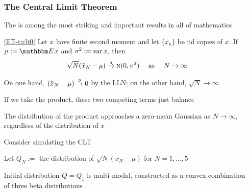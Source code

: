 \begin{frame}\frametitle{The Central Limit Theorem}

    \vspace{2em}
    The  
    is among the most striking and important results in all of
    mathematics
    
    \vspace{1em}
    \Thm\eqref{ET-t:clt0}
        Let $x$ have finite second
        moment and let $\{x_n\}$ be {\sc iid} copies of $x$.  If
        $\mu := \EE x$ and $\sigma^2 := \operatorname{var} x$, then
        \begin{equation*}
            \label{eq:clt0}
            \sqrt{N} (\bar x_N - \mu) 
            \stackrel { d } {\to} \textrm{\sc n}(0, \sigma^2)
             \quad \text{ as } \quad
             N \to \infty
        \end{equation*}
        
\end{frame}

\begin{frame}

    \vspace{2em}
    On one hand, $(\bar x_N - \mu) \stackrel { p } {\to} 0$ by the LLN; 
    on the other hand, $\sqrt{N} \to \infty$
    
    If we take the product, these two
    competing terms just balance
    
    \vspace{1em}
    The distribution of the product
    approaches a zero-mean Gaussian as $N \to \infty$, regardless of the
    distribution of $x$
    
\end{frame}

\begin{frame}

    \vspace{2em}
    Consider simulating the CLT
    
    Let $Q_N :=$ the distribution of $\sqrt{N} (\bar x_N - \mu)$
    for $N=1,\ldots,5$
    
    Initial distribution $Q=Q_1$ is multi-modal,
    constructed as a convex combination of three beta distributions
    
\end{frame}

